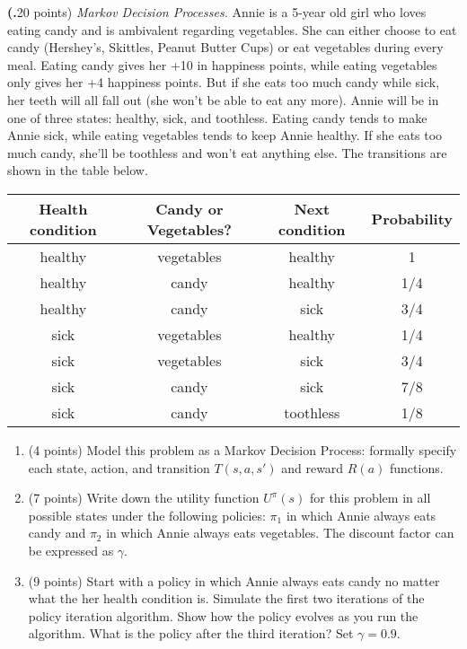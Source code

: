 \documentclass[12pt]{amsart}
\newenvironment{statement}[1]{\smallskip\noindent\color[rgb]{0.0,0.0,0.0} {\bf #1.}}{}
\theoremstyle{definition}
\theoremstyle{remark}
\newcommand{\1}{\mathds{1}}
\begin{document}
\begin{statement}{3}
(20 points) \emph{Markov Decision Processes. }
Annie is a 5-year old girl who loves eating candy and is ambivalent regarding vegetables. She can either choose to eat candy (Hershey's, Skittles, Peanut Butter Cups) or eat vegetables during every meal. Eating candy gives her +10 in happiness points, while eating vegetables only gives her +4 happiness points. But if she eats too much candy while sick, her teeth will all fall out (she won't be able to eat any more). Annie will be in one of three states: healthy, sick, and toothless. Eating candy tends to make Annie sick, while eating vegetables tends to keep Annie healthy. If she eats too much candy, she'll be toothless and won't eat anything else. The transitions are shown in the table below.

\begin{table}[htb]
\centering
    \begin{tabular}{|c|c|c|c|}
      \hline
        Health condition &	Candy or Vegetables? &	Next condition & Probability \\\hline
        healthy &	vegetables &	healthy & 	1 \\\hline
        healthy &	candy &	healthy & 	1/4 \\\hline
        healthy &	candy &	sick & 	3/4 \\\hline
        sick &	vegetables &	healthy & 	1/4 \\\hline
        sick &	vegetables &	sick & 	3/4 \\\hline
        sick &	candy &	sick & 	7/8 \\\hline
        sick &	candy &	toothless & 	1/8 \\\hline
    \end{tabular}
\end{table}
  
\begin{enumerate}
    \item (4 points) Model this problem as a Markov Decision Process: formally specify each state, action, and transition $T(s,a,s')$ and reward $R(a)$ functions.
    \item (7 points) Write down the utility function $U^\pi(s)$ for this problem in all possible states under the following policies: $\pi_1$ in which Annie always eats candy and $\pi_2$ in which Annie always eats vegetables. The discount factor can be expressed as $\gamma$.
    \item (9 points) Start with a policy in which Annie always eats candy no matter what the her health condition is. Simulate the first two iterations of the policy iteration algorithm. Show how the policy evolves as you run the algorithm. What is the policy after the third iteration? Set $\gamma = 0.9$.
    
\end{enumerate}
\end{statement}
\end{document}

